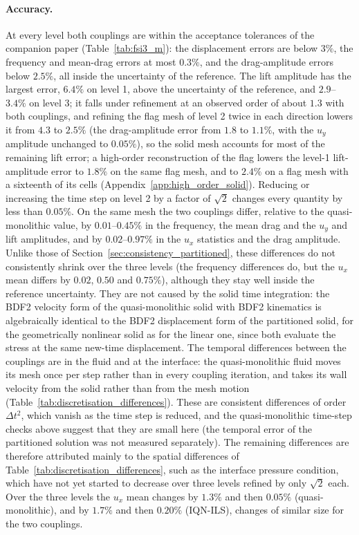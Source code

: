 \paragraph{Accuracy.}
At every level both couplings are within the acceptance tolerances of the companion paper (Table~\ref{tab:fsi3_m}): the displacement errors are below $3\%$, the frequency and mean-drag errors at most $0.3\%$, and the drag-amplitude errors below $2.5\%$, all inside the uncertainty of the reference.
The lift amplitude has the largest error, $6.4\%$ on level 1, above the uncertainty of the reference, and $2.9$--$3.4\%$ on level 3; it falls under refinement at an observed order of about $1.3$ with both couplings, and refining the flag mesh of level 2 twice in each direction lowers it from $4.3$ to $2.5\%$ (the drag-amplitude error from $1.8$ to $1.1\%$, with the $u_y$ amplitude unchanged to $0.05\%$), so the solid mesh accounts for most of the remaining lift error; a high-order reconstruction of the flag lowers the level-1 lift-amplitude error to $1.8\%$ on the same flag mesh, and to $2.4\%$ on a flag mesh with a sixteenth of its cells (Appendix~\ref{app:high_order_solid}).
Reducing or increasing the time step on level 2 by a factor of $\sqrt{2}$ changes every quantity by less than $0.05\%$.
On the same mesh the two couplings differ, relative to the quasi-monolithic value, by $0.01$--$0.45\%$ in the frequency, the mean drag and the $u_y$ and lift amplitudes, and by $0.02$--$0.97\%$ in the $u_x$ statistics and the drag amplitude.
Unlike those of Section~\ref{sec:consistency_partitioned}, these differences do not consistently shrink over the three levels (the frequency differences do, but the $u_x$ mean differs by $0.02$, $0.50$ and $0.75\%$), although they stay well inside the reference uncertainty.
They are not caused by the solid time integration: the BDF2 velocity form of the quasi-monolithic solid with BDF2 kinematics is algebraically identical to the BDF2 displacement form of the partitioned solid, for the geometrically nonlinear solid as for the linear one, since both evaluate the stress at the same new-time displacement.
The temporal differences between the couplings are in the fluid and at the interface: the quasi-monolithic fluid moves its mesh once per step rather than in every coupling iteration, and takes its wall velocity from the solid rather than from the mesh motion (Table~\ref{tab:discretisation_differences}).
These are consistent differences of order $\Delta t^2$, which vanish as the time step is reduced, and the quasi-monolithic time-step checks above suggest that they are small here (the temporal error of the partitioned solution was not measured separately).
The remaining differences are therefore attributed mainly to the spatial differences of Table~\ref{tab:discretisation_differences}, such as the interface pressure condition, which have not yet started to decrease over three levels refined by only $\sqrt{2}$ each.
Over the three levels the $u_x$ mean changes by $1.3\%$ and then $0.05\%$ (quasi-monolithic), and by $1.7\%$ and then $0.20\%$ (IQN-ILS), changes of similar size for the two couplings.

